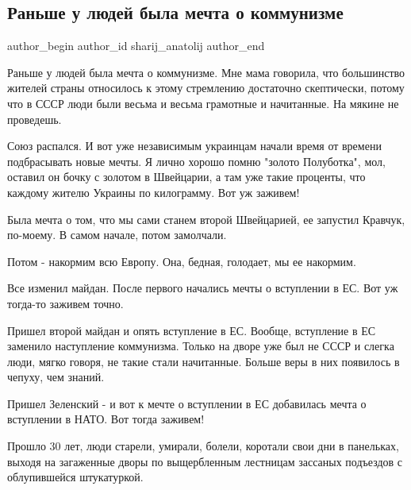  
 
 
 
 
 
\subsection{Раньше у людей была мечта о коммунизме}
\label{sec:01_08_2021.fb.sharij_anatolij.1.mechta}
 
\ifcmt
 author_begin
   author_id sharij_anatolij
 author_end
\fi

Раньше у людей была мечта о коммунизме. Мне мама говорила, что большинство
жителей страны относилось к этому стремлению достаточно скептически, потому что
в СССР люди были весьма и весьма грамотные и начитанные. На мякине не
проведешь.

Союз распался. И вот уже независимым украинцам начали время от времени
подбрасывать новые мечты. Я лично хорошо помню "золото Полуботка", мол, оставил
он бочку с золотом в Швейцарии, а там уже такие проценты, что каждому жителю
Украины по килограмму. Вот уж заживем! 

Была мечта о том, что мы сами станем второй Швейцарией, ее запустил Кравчук,
по-моему. В самом начале, потом замолчали. 

Потом - накормим всю Европу. Она, бедная, голодает, мы ее накормим. 

Все изменил майдан. После первого начались мечты о вступлении в ЕС. Вот уж
тогда-то заживем точно.

Пришел второй майдан и опять вступление в ЕС. Вообще, вступление в ЕС заменило
наступление коммунизма. Только на дворе уже был не СССР и слегка люди, мягко
говоря, не такие стали начитанные. Больше веры в них появилось в чепуху, чем
знаний. 

Пришел Зеленский - и вот к мечте о вступлении в ЕС добавилась мечта о
вступлении в НАТО. Вот тогда заживем!

Прошло 30 лет, люди старели, умирали, болели, коротали свои дни в панельках,
выходя на загаженные дворы по выщербленным лестницам зассаных подъездов с
облупившейся штукатуркой. 

